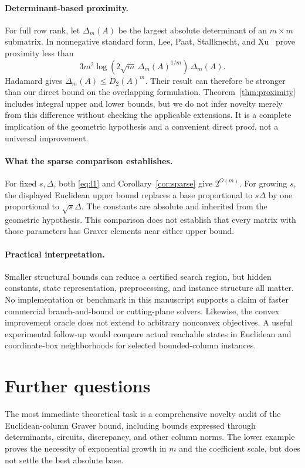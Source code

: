 \documentclass[11pt]{article}
\theoremstyle{definition}
\theoremstyle{remark}
\begin{document}
\paragraph{Determinant-based proximity.}
For full row rank, let $\Delta_m(A)$ be the largest absolute determinant
of an $m\times m$ submatrix. In nonnegative standard form,
Lee, Paat, Stallknecht, and Xu~\cite{LPSX} prove proximity less than
\[
 3m^2\log(2\sqrt m\,\Delta_m(A)^{1/m})\,\Delta_m(A).
\]
Hadamard gives $\Delta_m(A)\le D_2(A)^m$. Their result can therefore
be stronger than our direct bound on the overlapping formulation.
Theorem~\ref{thm:proximity} includes integral upper and lower bounds,
but we do not infer novelty merely from this difference without checking
the applicable extensions. It is a complete implication of the geometric
hypothesis and a convenient direct proof, not a universal improvement.

\paragraph{What the sparse comparison establishes.}
For fixed $s,\Delta$, both \eqref{eq:l1} and Corollary~\ref{cor:sparse}
give $2^{O(m)}$. For growing $s$, the displayed Euclidean upper bound
replaces a base proportional to $s\Delta$ by one proportional to
$\sqrt s\Delta$. The constants are absolute and inherited from the
geometric hypothesis. This comparison does not establish that every
matrix with those parameters has Graver elements near either upper bound.

\paragraph{Practical interpretation.}
Smaller structural bounds can reduce a certified search region, but hidden
constants, state representation, preprocessing, and instance structure
all matter. No implementation or benchmark in this manuscript supports
a claim of faster commercial branch-and-bound or cutting-plane solvers.
Likewise, the convex improvement oracle does not extend to arbitrary
nonconvex objectives. A useful experimental follow-up would compare
actual reachable states in Euclidean and coordinate-box neighborhoods
for selected bounded-column instances.

\section{Further questions}

The most immediate theoretical task is a comprehensive novelty audit of
the Euclidean-column Graver bound, including bounds expressed through
determinants, circuits, discrepancy, and other column norms. The lower
example proves the necessity of exponential growth in $m$ and the
coefficient scale, but does not settle the best absolute base.
\end{document}
